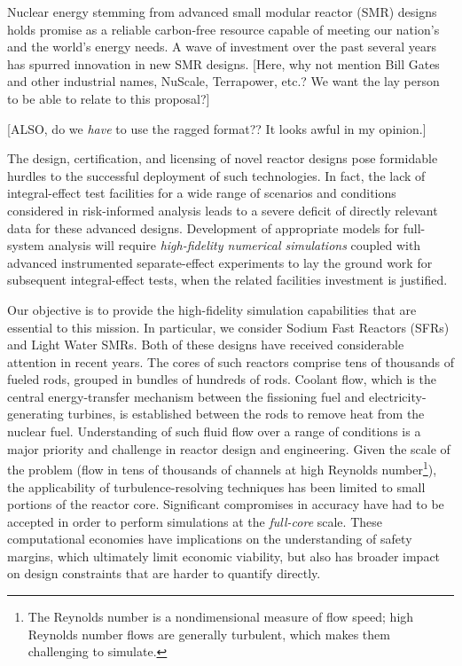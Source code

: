 


Nuclear energy stemming from advanced small modular reactor (SMR) designs
holds promise as a reliable carbon-free resource capable of meeting our
nation's and the world's energy needs.  A wave of investment over the past
several years has spurred innovation in new SMR designs. 
[Here, why not mention Bill Gates and other industrial names, NuScale,
Terrapower, etc.?  We want the lay person to be able to relate to this
proposal?]

[ALSO, do we {\em have} to use the ragged format?? It looks awful in my
opinion.]

The design, certification, and licensing of novel reactor designs pose
formidable hurdles to the successful deployment of such technologies. In fact,
the lack of integral-effect test facilities for a wide range of scenarios and
conditions considered in risk-informed analysis leads to a severe deficit of
directly relevant data for these advanced designs.  Development of  appropriate
models for full-system analysis will require {\em high-fidelity numerical
simulations} coupled with advanced instrumented separate-effect experiments to
lay the ground work for subsequent integral-effect tests, when the related
facilities investment is justified.

Our objective is to provide the high-fidelity simulation capabilities that are
essential to this mission.  In particular, we consider Sodium Fast Reactors
(SFRs) and Light Water SMRs. Both of these designs have received considerable
attention in recent years. The cores of such reactors comprise tens of
thousands of fueled rods, grouped in bundles of hundreds of rods. Coolant flow,
which is the central energy-transfer mechanism between the fissioning fuel and
electricity-generating turbines, is established between the rods to remove heat
from the nuclear fuel.  Understanding of such fluid flow over a range of
conditions is a major priority and challenge in reactor design and engineering.
Given the scale of the problem (flow in tens of thousands of channels at high
Reynolds number\footnote{The Reynolds number is a nondimensional measure of flow
speed; high Reynolds number flows are generally turbulent, which makes them
challenging to simulate.}), the
applicability of turbulence-resolving techniques has been limited to small
portions of the reactor core. Significant compromises in accuracy have had to
be accepted in order to perform simulations at the {\em full-core} scale.
These computational economies have implications on the understanding of safety
margins, which ultimately limit economic viability, but also has broader impact
on design constraints that are harder to quantify directly.

